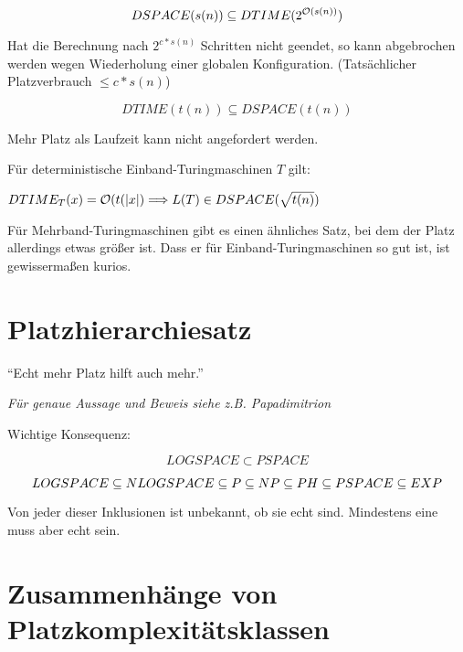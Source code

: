 $$ DSPACE(s(n)) \subseteq DTIME (2^{\mathcal{O}(s(n))}) $$

Hat die Berechnung nach $2^{c*s(n)}$ Schritten nicht geendet, so kann abgebrochen werden wegen Wiederholung einer globalen Konfiguration. (Tatsächlicher Platzverbrauch $\leq c * s(n)$)



$$ DTIME(t(n)) \subseteq DSPACE (t(n)) $$

Mehr Platz als Laufzeit kann nicht angefordert werden.





\begin{satz}

    Für deterministische Einband-Turingmaschinen $T$ gilt:

    $DTIME_T(x) = \mathcal{O}(t(|x|) \Longrightarrow  L(T) \in DSPACE(\sqrt{t(n)})$


\end{satz}

Für Mehrband-Turingmaschinen gibt es einen ähnliches Satz, bei dem der Platz allerdings etwas größer ist. Dass er für Einband-Turingmaschinen so gut ist, ist gewissermaßen kurios.





\section{Platzhierarchiesatz}

\begin{satz}

    ``Echt mehr Platz hilft auch mehr.''

    \textit{Für genaue Aussage und Beweis siehe z.B. Papadimitrion}
\end{satz}

Wichtige Konsequenz:

$$ LOGSPACE \subset PSPACE $$

$$ LOGSPACE \subseteq NLOGSPACE \subseteq P \subseteq NP \subseteq PH \subseteq PSPACE \subseteq EXP$$

Von jeder dieser Inklusionen ist unbekannt, ob sie echt sind. Mindestens eine muss aber echt sein.






\section{Zusammenhänge von Platzkomplexitätsklassen}



